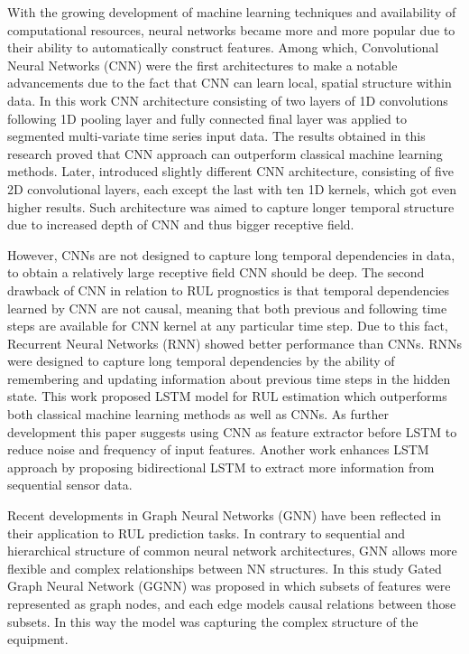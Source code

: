 With the growing development of machine learning techniques and availability of computational resources, neural networks became more and more popular due to their ability to automatically construct features. Among which, Convolutional Neural Networks (CNN) were the first architectures to make a notable advancements due to the fact that CNN can learn local, spatial structure within data.  In this work \cite{Babu2016} CNN architecture consisting of two layers of 1D convolutions following 1D pooling layer and fully connected final layer was applied to segmented multi-variate time series input data. The results obtained in this research proved that CNN approach can outperform classical machine learning methods. Later, \cite{LI20181} introduced slightly different CNN architecture, consisting of five 2D convolutional layers, each except the last with ten 1D kernels, which got even higher results. Such architecture was aimed to capture longer temporal structure due to increased depth of CNN and thus bigger receptive field.  

However, CNNs are not designed to capture long temporal dependencies in data, to obtain a relatively large receptive field CNN should be deep. The second drawback of CNN in relation to RUL prognostics is that temporal dependencies learned by CNN are not causal, meaning that both previous and following time steps are available for CNN kernel at any particular time step. Due to this fact, Recurrent Neural Networks (RNN) showed better performance than CNNs. RNNs were designed to capture long temporal dependencies by the ability of remembering and updating information about previous time steps in the hidden state. This work \cite{Zheng2017} proposed LSTM model for RUL estimation which outperforms both classical machine learning methods as well as CNNs. As further development this paper suggests using CNN as feature extractor before LSTM to reduce noise and frequency of input features. Another work \cite{ELSHEIKH2019148} enhances LSTM approach by proposing bidirectional LSTM to extract more information from sequential sensor data.  

Recent developments in Graph Neural Networks (GNN) have been reflected in their application to RUL prediction tasks. In contrary to sequential and hierarchical structure of common neural network architectures, GNN allows more flexible and complex relationships between NN structures. In this study \cite{GNMR2020} Gated Graph Neural Network (GGNN) \cite{GatedNN2015} was proposed in which subsets of features were represented as graph nodes, and each edge models causal relations between those subsets. In this way the model was capturing the complex structure of the equipment.  

